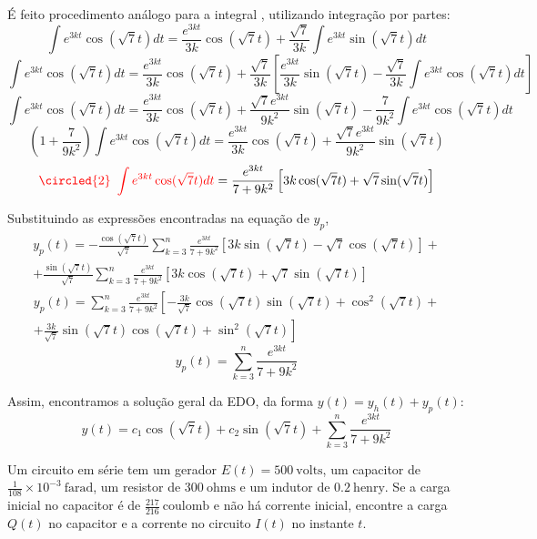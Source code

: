 \documentclass[oneside,12pt,a4paper]{report}
\begin{document}
\begin{resolucao}
    É feito procedimento análogo para a integral , utilizando integração por partes:
    \[\int e^{3kt}\cos(\sqrt{7}t)dt=\frac{e^{3kt}}{3k}\cos(\sqrt{7}t)+\frac{\sqrt{7}}{3k}\int e^{3kt}\sin(\sqrt{7}t)dt\]
    \[\int e^{3kt}\cos(\sqrt{7}t)dt=\frac{e^{3kt}}{3k}\cos(\sqrt{7}t)+\frac{\sqrt{7}}{3k}\left[\frac{e^{3kt}}{3k}\sin(\sqrt{7}t)-\frac{\sqrt{7}}{3k}\int e^{3kt}\cos(\sqrt{7}t)dt\right]\]
    \[\int e^{3kt}\cos(\sqrt{7}t)dt=\frac{e^{3kt}}{3k}\cos(\sqrt{7}t)+\frac{\sqrt{7}e^{3kt}}{9k^2}\sin(\sqrt{7}t)-\frac{7}{9k^2}\int e^{3kt}\cos(\sqrt{7}t)dt\]
    \[\left(1+\frac{7}{9k^2}\right)\int e^{3kt}\cos(\sqrt{7}t)dt=\frac{e^{3kt}}{3k}\cos(\sqrt{7}t)+\frac{\sqrt{7}e^{3kt}}{9k^2}\sin(\sqrt{7}t)\]
    \[\color{red}\text{\circled{2} }\int e^{3kt}\cos(\sqrt{7}t)dt\color{black}=\frac{e^{3kt}}{7+9k^2}\left[3k\cos(\sqrt{7}t)+\sqrt{7}\sin(\sqrt{7}t)\right]\]

    Substituindo as expressões encontradas na equação de $y_p$, 
    \begin{gather*}
        y_p(t)=-\frac{\cos(\sqrt{7}t)}{\sqrt{7}}\sum_{k=3}^{n}\frac{e^{3kt}}{7+9k^2}\left[3k\sin(\sqrt{7}t)-\sqrt{7}\cos(\sqrt{7}t)\right]+\\+\frac{\sin(\sqrt{7}t)}{\sqrt{7}}\sum_{k=3}^{n}\frac{e^{3kt}}{7+9k^2}\left[3k\cos(\sqrt{7}t)+\sqrt{7}\sin(\sqrt{7}t)\right]
    \end{gather*}
    \begin{gather*}
        y_p(t)=\sum_{k=3}^{n}\frac{e^{3kt}}{7+9k^2}\left[-\frac{3k}{\sqrt{7}}\cos(\sqrt{7}t)\sin(\sqrt{7}t)+\cos^2(\sqrt{7}t)\right.+\\\left.+\frac{3k}{\sqrt{7}}\sin(\sqrt{7}t)\cos(\sqrt{7}t)+\sin^2(\sqrt{7}t)\right]
    \end{gather*}
    \[y_p(t)=\sum_{k=3}^{n}\frac{e^{3kt}}{7+9k^2}\]

    Assim, encontramos a solução geral da EDO, da forma $y(t)=y_h(t)+y_p(t)$:
    \[\boxed{y(t)=c_1\cos(\sqrt{7}t)+c_2\sin(\sqrt{7}t)+\sum_{k=3}^{n}\frac{e^{3kt}}{7+9k^2}}\]

\end{resolucao}

\exercicio[] Um circuito em série tem um gerador $E(t)=500~\mathrm{volts}$, um capacitor de $\frac{1}{108}\times10^{-3}~\mathrm{farad}$, um resistor de $300~\mathrm{ohms}$ e um indutor de $0.2~\mathrm{henry}$. Se a carga inicial no capacitor é de $\frac{217}{216}~\mathrm{coulomb}$ e não há corrente inicial, encontre a carga $Q(t)$ no capacitor e a corrente no circuito $I(t)$ no instante $t$.
\end{document}

